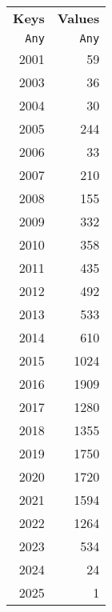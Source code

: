 \begin{tabular}{rr}
  \hline
  \textbf{Keys} & \textbf{Values} \\
  \texttt{Any} & \texttt{Any} \\\hline
  2001 & 59 \\
  2003 & 36 \\
  2004 & 30 \\
  2005 & 244 \\
  2006 & 33 \\
  2007 & 210 \\
  2008 & 155 \\
  2009 & 332 \\
  2010 & 358 \\
  2011 & 435 \\
  2012 & 492 \\
  2013 & 533 \\
  2014 & 610 \\
  2015 & 1024 \\
  2016 & 1909 \\
  2017 & 1280 \\
  2018 & 1355 \\
  2019 & 1750 \\
  2020 & 1720 \\
  2021 & 1594 \\
  2022 & 1264 \\
  2023 & 534 \\
  2024 & 24 \\
  2025 & 1 \\\hline
\end{tabular}
